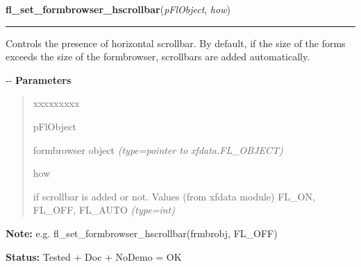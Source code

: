     \vspace{0.5ex}

\hspace{.8\funcindent}\begin{boxedminipage}{\funcwidth}

    \raggedright \textbf{fl\_set\_formbrowser\_hscrollbar}(\textit{pFlObject}, \textit{how})

    \vspace{-1.5ex}

    \rule{\textwidth}{0.5\fboxrule}
\setlength{\parskip}{2ex}

Controls the presence of horizontal scrollbar. By default, if the size
of the forms exceeds the size of the formbrowser, scrollbars are added
automatically.

-{}-
\setlength{\parskip}{1ex}
      \textbf{Parameters}
      \vspace{-1ex}

      \begin{quote}
        \begin{Ventry}{xxxxxxxxx}

          \item[pFlObject]


formbrowser object
            {\it (type=pointer to xfdata.FL\_OBJECT)}

          \item[how]


if scrollbar is added or not. Values (from xfdata module) FL\_ON,
FL\_OFF, FL\_AUTO
            {\it (type=int)}

        \end{Ventry}

      \end{quote}

\textbf{Note:} 
e.g. fl\_set\_formbrowser\_hscrollbar(frmbrobj, FL\_OFF)


\textbf{Status:} 
Tested + Doc + NoDemo = OK


    \end{boxedminipage}

    \label{xformslib:flformbrowser:fl_set_formbrowser_vscrollbar}

    \vspace{0.5ex}

